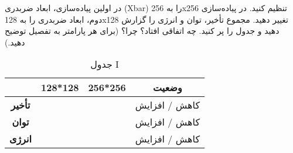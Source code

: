 \documentclass[12pt]{exam}
\begin{document}
\begin{questions}
	در اولین پیاده‌سازی، ابعاد ضربدری (Xbar) را به 256x256 تنظیم کنید. در پیاده‌سازی دوم، ابعاد ضربدری را به 128x128 تغییر دهید. مجموع تأخیر، توان و انرژی را گزارش دهید و جدول را پر کنید. چه اتفاقی افتاد؟ چرا؟ (برای هر پارامتر به تفصیل توضیح دهید.)
	
	\begin{table}[h]
		\centering
		\begin{tabular}{|c|c|c|c|}
			\hline
			& \textbf{128*128} & \textbf{256*256} & \textbf{وضعیت} \\ \hline
			\textbf{تأخیر} & & & کاهش / افزایش \\ \hline
			\textbf{توان} & & & کاهش / افزایش \\ \hline
			\textbf{انرژی} & & & کاهش / افزایش \\ \hline
		\end{tabular}
		\caption{جدول I}
	\end{table}
		
	
 \end{questions}
\end{document}
